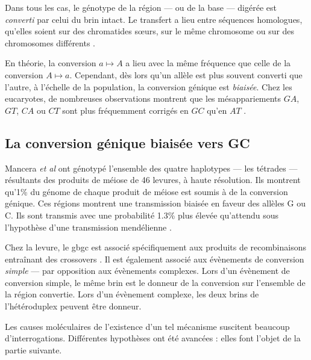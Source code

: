 \documentclass[11pt, oneside]{scrartcl}
\begin{document}
Dans tous les cas, le génotype de la région --- ou de la base --- digérée est
\emph{converti} par celui du brin intact. Le transfert a lieu entre séquences
homologues, qu'elles soient sur des chromatides sœurs, sur le même chromosome ou
sur des chromosomes différents \cite{chen_gene_2007}.

\begin{transition}

En théorie, la conversion $a \mapsto A$ a lieu avec la même fréquence que celle
de la conversion $A \mapsto a$. Cependant, dès lors qu'un allèle est plus
souvent converti que l'autre, à l'échelle de la population, la conversion
génique est {\em biaisée}. Chez les eucaryotes, de nombreuses observations montrent
que les mésappariements $GA$, $GT$, $CA$ ou $CT$ sont plus fréquemment corrigés
en $GC$ qu'en $AT$ \cite{duret_biased_2009}. 

\end{transition}

\subsection{La conversion génique biaisée vers GC}
\label{sec:orgheadline7}


Mancera \emph{et al} \cite{mancera_high-resolution_2008} ont génotypé l'ensemble des
quatre haplotypes --- les tétrades --- résultants des produits de méiose de 46
levures, à haute résolution. Ils montrent qu'1\% du génome de chaque produit de
méiose est soumis à de la conversion génique. Ces régions montrent une
transmission biaisée en faveur des allèles G ou C. Ils sont transmis avec une
probabilité 1.3\% plus élevée qu'attendu sous l'hypothèse d'une transmission
mendélienne \cite{mancera_high-resolution_2008}. 

Chez la levure, le \ac{gbgc} est associé spécifiquement aux produits de
recombinaisons entraînant des crossovers \cite{lesecque_gc-biased_2013}. Il est
également associé aux évènements de conversion \emph{simple} --- par opposition aux
évènements complexes. Lors d'un évènement de conversion simple, le même brin est
le donneur de la conversion sur l'ensemble de la région convertie. Lors d'un
évènement complexe, les deux brins de l'hétéroduplex peuvent être donneur. 

\begin{transition}
  Les causes moléculaires de l'existence d'un tel mécanisme suscitent beaucoup
  d'interrogations. Différentes hypothèses ont été avancées : elles font l'objet
  de la partie suivante. 
\end{transition}
\end{document}
